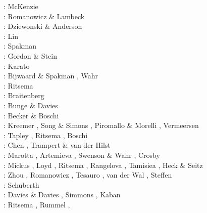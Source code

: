 \begin{scriptsize}
\nineteensixtyseven: McKenzie \cite{mcke67}\\
\nineteenseventyseven: Romanowicz \& Lambeck \cite{rola77}\\
\nineteeneightyone: Dziewonski \& Anderson \cite{dzan81}\\
\nineteenninety: Lin \etal \cite{lips90}\\
\nineteenninetyone: Spakman \cite{spak91}\\
\nineteenninetytwo: Gordon \& Stein \cite{gost92}\\
\nineteenninetythree: Karato \cite{kara93}\\
\nineteenninetyeight: Bijwaard \& Spakman \cite{bisp98}, Wahr \etal \cite{wamb98}\\
\nineteenninetynine: Ritsema \etal \cite{rivw99}\\
\twothousand: Braitenberg \etal \cite{brzf00}\\
\twothousandone: Bunge \& Davies \cite{buda01}\\
\twothousandtwo: Becker \& Boschi \cite{bebo02}\\
\twothousandthree: Kreemer \etal \cite{krhh03}, Song \& Simons \cite{sosi03}, 
                   Piromallo \& Morelli \cite{pimo03}, Vermeersen \cite{verm03}\\
\twothousandfour: Tapley \etal \cite{tabr04}, Ritsema \etal \cite{rivw04}, Boschi \etal \cite{boek04}\\
\twothousandfive: Chen \etal \cite{chrw05}, Trampert \& van der Hilst \cite{trva05}\\
\twothousandsix: Marotta \etal \cite{masr06}, Artemieva \cite{arte06}, 
                 Swenson \& Wahr \cite{swwa06}, Crosby \etal \cite{crms06}\\
\twothousandseven: Mickus \etal \cite{mitk07}, Loyd \etal \cite{lobc07}, Ritsema \etal \cite{rimb07}, 
                   Rangelova \etal \cite{ravb07}, Tamisiea \etal \cite{tamd07}, 
                   Heck \& Seitz \cite{hese07}\\
\twothousandeight: Zhou \cite{zhou08}, Romanowicz \cite{roma08}, 
                   Tesauro \etal \cite{tekc08}, van der Wal \cite{vaws08}, 
                   Steffen \etal \cite{stdm08}\\
\twothousandnine: Schuberth \etal \cite{scbr09}\\
\twothousandten: Davies \& Davies \cite{dada10}, Simmons \etal \cite{sifb10}, 
                 Kaban \etal \cite{katc10}\\
\twothousandeleven: Ritsema \etal \cite{ridv11}, Rummel \etal \cite{ruys11}, 

\end{scriptsize}
